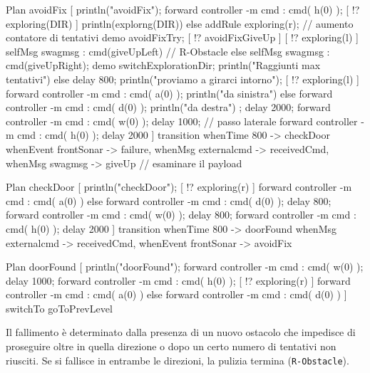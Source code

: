 \documentclass{../llncs}
\newcommand{\code}[1]{{\color{blue}\small{\texttt{#1}}}}
\begin{document}
\begin{qacode}[caption={SoftwareAgent, pt7}]
Plan avoidFix [
	println("avoidFix");
	forward controller -m cmd : cmd( h(0) );
	[ !? exploring(DIR) ] println(explorng(DIR))
	else addRule exploring(r);
	// aumento contatore di tentativi
	demo avoidFixTry;
	[ !? avoidFixGiveUp ] {
		[ !? exploring(l) ] selfMsg swagmsg : cmd(giveUpLeft) // R-Obstacle
		else selfMsg swagmsg : cmd(giveUpRight);
		demo switchExplorationDir;
		println("Raggiunti max tentativi")
	} else {
		delay 800;
		println("proviamo a girarci intorno");
		[ !? exploring(l) ] {
			forward controller -m cmd : cmd( a(0) );
			println("da sinistra")
		}
		else {
			forward controller -m cmd : cmd( d(0) );
			println("da destra")
		};
		delay 2000;
		forward controller -m cmd : cmd( w(0) );
		delay 1000; // passo laterale
		forward controller -m cmd : cmd( h(0) );
		delay 2000
	}
]
transition
	whenTime 800 -> checkDoor
	whenEvent frontSonar -> failure,
	whenMsg externalcmd -> receivedCmd,
	whenMsg swagmsg -> giveUp // esaminare il payload

Plan checkDoor [
	println("checkDoor");
	[ !? exploring(r) ] forward controller -m cmd : cmd( a(0) )
	else forward controller -m cmd : cmd( d(0) );
	delay 800;
	forward controller -m cmd : cmd( w(0) );
	delay 800;
	forward controller -m cmd : cmd( h(0) );
	delay 2000
]
transition
	whenTime 800 -> doorFound
	whenMsg externalcmd -> receivedCmd,
	whenEvent frontSonar -> avoidFix

Plan doorFound [
	println("doorFound");
	forward controller -m cmd : cmd( w(0) );
	delay 1000;
	forward controller -m cmd : cmd( h(0) );
	[ !? exploring(r) ] forward controller -m cmd : cmd( a(0) )
	else forward controller -m cmd : cmd( d(0) )
]
switchTo goToPrevLevel
\end{qacode}

Il fallimento è determinato dalla presenza di un nuovo ostacolo che impedisce di proseguire oltre in quella direzione o dopo un certo numero di tentativi non riusciti. Se si fallisce in entrambe le direzioni, la pulizia termina (\code{R-Obstacle}).\\
\end{document}
